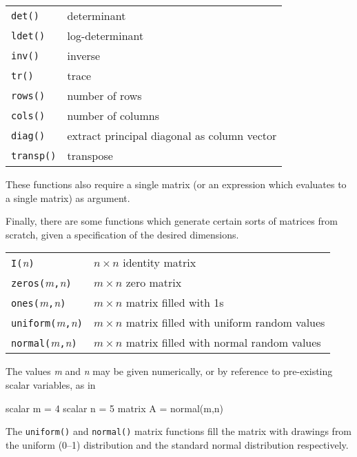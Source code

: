 \begin{center}
\begin{tabular}{ll}
\texttt{det()} & determinant \\
\texttt{ldet()} & log-determinant \\
\texttt{inv()} & inverse \\
\texttt{tr()} & trace \\
\texttt{rows()} & number of rows \\
\texttt{cols()} & number of columns \\
\texttt{diag()} & extract principal diagonal as column vector \\
\texttt{transp()} & transpose 
\end{tabular}
\end{center}

These functions also require a single matrix (or an expression which
evaluates to a single matrix) as argument.

Finally, there are some functions which generate certain sorts of
matrices from scratch, given a specification of the desired
dimensions.

\begin{center}
\begin{tabular}{ll}
\texttt{I(}\textsl{n}\texttt{)} & $n\times n$ identity matrix \\
\texttt{zeros(}\textsl{m}\texttt{,}\textsl{n}\texttt{)} & 
   $m\times n$ zero matrix \\
\texttt{ones(}\textsl{m}\texttt{,}\textsl{n}\texttt{)} &
   $m\times n$ matrix filled with 1s \\
\texttt{uniform(}\textsl{m}\texttt{,}\textsl{n}\texttt{)} &
   $m\times n$ matrix filled with uniform random values \\
\texttt{normal(}\textsl{m}\texttt{,}\textsl{n}\texttt{)} &
   $m\times n$ matrix filled with normal random values \\
\end{tabular}
\end{center}

The values \textsl{m} and \textsl{n} may be given numerically, or by
reference to pre-existing scalar variables, as in
%
\begin{code}
scalar m = 4
scalar n = 5
matrix A = normal(m,n)
\end{code}
%
The \texttt{uniform()} and \texttt{normal()} matrix functions fill the
matrix with drawings from the uniform (0--1) distribution and the
standard normal distribution respectively.

